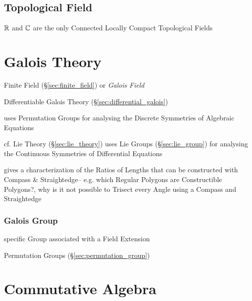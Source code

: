 \subsection{Topological Field}\label{sec:topological_field}

$\mathbb{R}$ and $\mathbb{C}$ are the only Connected Locally Compact
Topological Fields



\section{Galois Theory}\label{sec:galois_theory}

Finite Field (\S\ref{sec:finite_field}) or \emph{Galois Field}

Differentiable Galois Theory (\S\ref{sec:differential_galois})

uses Permutation Groups for analysing the Discrete Symmetries of
Algebraic Equations %

cf. Lie Theory (\S\ref{sec:lie_theory}) uses Lie Groups
(\S\ref{sec:lie_group}) for analysing the Continuous Symmetries of
Differential Equations

gives a characterization of the Ratios of Lengths that can be constructed with
Compass \& Straightedge-- e.g. which Regular Polygons are Constructible
Polygons?, why is it not possible to Trisect every Angle using a Compass and
Straightedge



\subsubsection{Galois Group}\label{sec:galois_group}

specific Group associated with a Field Extension %

Permutation Groups (\S\ref{sec:permutation_group})



\section{Commutative Algebra}\label{sec:commutative_algebra}


